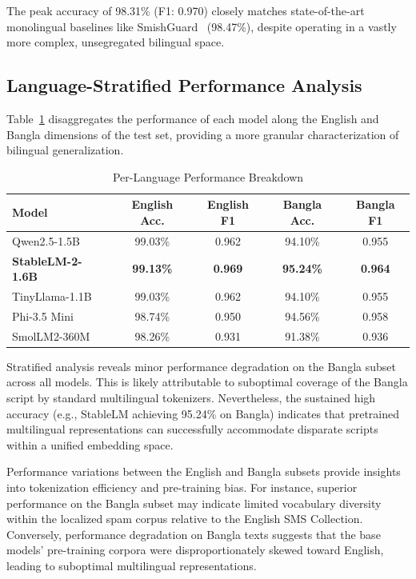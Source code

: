 \documentclass[journal]{IEEEtran}
\begin{document}
The peak accuracy of 98.31\% (F1: 0.970) closely matches state-of-the-art monolingual baselines like SmishGuard~\cite{ref6} (98.47\%), despite operating in a vastly more complex, unsegregated bilingual space.

\subsection{Language-Stratified Performance Analysis}

Table~\ref{tab:lang_results} disaggregates the performance of each model along the English
and Bangla dimensions of the test set, providing a more granular
characterization of bilingual generalization.

\begin{table}[htbp]
\caption{Per-Language Performance Breakdown}
\label{tab:lang_results}
\centering
\begin{tabular}{lcccc}
\toprule
\textbf{Model} & \textbf{English Acc.} & \textbf{English F1} & \textbf{Bangla Acc.} & \textbf{Bangla F1} \\
\midrule
Qwen2.5-1.5B & 99.03\% & 0.962 & 94.10\% & 0.955 \\
\rowcolor{gray!20} \textbf{StableLM-2-1.6B} & \textbf{99.13\%} & \textbf{0.969} & \textbf{95.24\%} & \textbf{0.964} \\
TinyLlama-1.1B & 99.03\% & 0.962 & 94.10\% & 0.955 \\
Phi-3.5 Mini & 98.74\% & 0.950 & 94.56\% & 0.958 \\
SmolLM2-360M & 98.26\% & 0.931 & 91.38\% & 0.936 \\
\bottomrule
\end{tabular}
\end{table}



Stratified analysis reveals minor performance degradation on the Bangla subset across all models. This is likely attributable to suboptimal coverage of the Bangla script by standard multilingual tokenizers. Nevertheless, the sustained high accuracy (e.g., StableLM achieving 95.24\% on Bangla) indicates that pretrained multilingual representations can successfully accommodate disparate scripts within a unified embedding space.

Performance variations between the English and Bangla subsets provide insights into tokenization efficiency and pre-training bias. For instance, superior performance on the Bangla subset may indicate limited vocabulary diversity within the localized spam corpus relative to the English SMS Collection. Conversely, performance degradation on Bangla texts suggests that the base models' pre-training corpora were disproportionately skewed toward English, leading to suboptimal multilingual representations.
\end{document}
